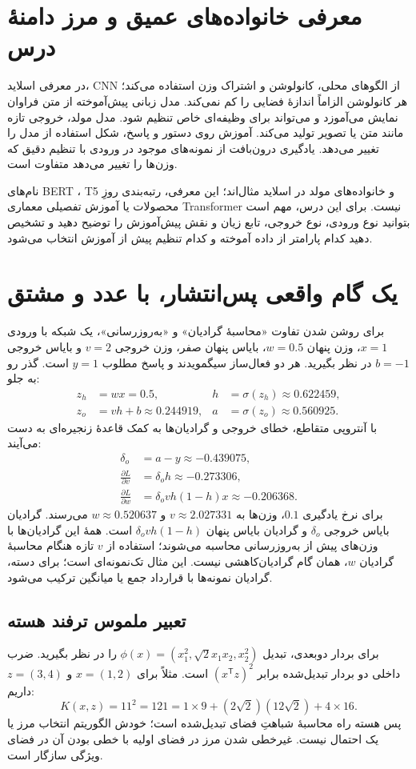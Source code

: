 \documentclass[12pt,a4paper,oneside]{report}
\begin{document}
\section{معرفی خانواده‌های عمیق و مرز دامنهٔ درس}
در معرفی اسلاید، CNN از الگوهای محلی، کانولوشن و اشتراک وزن استفاده می‌کند؛ هر کانولوشن الزاماً اندازهٔ فضایی را کم نمی‌کند. مدل زبانی پیش‌آموخته از متن فراوان نمایش می‌آموزد و می‌تواند برای وظیفه‌ای خاص تنظیم شود. مدل مولد، خروجی تازه مانند متن یا تصویر تولید می‌کند. آموزش روی دستور و پاسخ، شکل استفاده از مدل را تغییر می‌دهد. یادگیری درون‌بافت از نمونه‌های موجود در ورودی با تنظیم دقیق که وزن‌ها را تغییر می‌دهد متفاوت است.

نام‌های BERT ، T5 و خانواده‌های مولد در اسلاید مثال‌اند؛ این معرفی، رتبه‌بندی روزِ محصولات یا آموزش تفصیلی معماری Transformer نیست. برای این درس، مهم است بتوانید نوع ورودی، نوع خروجی، تابع زیان و نقش پیش‌آموزش را توضیح دهید و تشخیص دهید کدام پارامتر از داده آموخته و کدام تنظیم پیش از آموزش انتخاب می‌شود.
\section{یک گام واقعی پس‌انتشار، با عدد و مشتق}
برای روشن شدن تفاوت «محاسبهٔ گرادیان» و «به‌روزرسانی»، یک شبکه با ورودی $x=1$، وزن پنهان $w=0.5$، بایاس پنهان صفر، وزن خروجی $v=2$ و بایاس خروجی $b=-1$ در نظر بگیرید. هر دو فعال‌ساز سیگمویدند و پاسخ مطلوب $y=1$ است. گذر رو به جلو:
\begin{align*}
z_h&=wx=0.5,& h&=\sigma(z_h)\approx0.622459,\\
z_o&=vh+b\approx0.244919,& a&=\sigma(z_o)\approx0.560925.
\end{align*}
با آنتروپی متقاطع، خطای خروجی و گرادیان‌ها به کمک قاعدهٔ زنجیره‌ای به دست می‌آیند:
\begin{align*}
\delta_o&=a-y\approx-0.439075,\\
\frac{\partial L}{\partial v}&=\delta_o h\approx-0.273306,\\
\frac{\partial L}{\partial w}&=\delta_o v h(1-h)x\approx-0.206368.
\end{align*}
برای نرخ یادگیری $0.1$، وزن‌ها به $v\approx2.027331$ و $w\approx0.520637$ می‌رسند. گرادیان بایاس خروجی $\delta_o$ و گرادیان بایاس پنهان $\delta_o v h(1-h)$ است. همهٔ این گرادیان‌ها با وزن‌های پیش از به‌روزرسانی محاسبه می‌شوند؛ استفاده از $v$ تازه هنگام محاسبهٔ گرادیان $w$، همان گام گرادیان‌کاهشی نیست. این مثال تک‌نمونه‌ای است؛ برای دسته، گرادیان نمونه‌ها با قرارداد جمع یا میانگین ترکیب می‌شود.

\subsection*{تعبیر ملموس ترفند هسته}
برای بردار دوبعدی، تبدیل $\phi(x)=(x_1^2,\sqrt2x_1x_2,x_2^2)$ را در نظر بگیرید. ضرب داخلی دو بردار تبدیل‌شده برابر $(x^\mathsf Tz)^2$ است. مثلاً برای $x=(1,2)$ و $z=(3,4)$ داریم:
\[K(x,z)=11^2=121=1\times9+(2\sqrt2)(12\sqrt2)+4\times16.\]
پس هسته راه محاسبهٔ شباهتِ فضای تبدیل‌شده است؛ خودش الگوریتم انتخاب مرز یا یک احتمال نیست. غیرخطی شدن مرز در فضای اولیه با خطی بودن آن در فضای ویژگی سازگار است.
\end{document}
